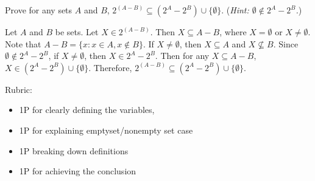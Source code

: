 \documentclass{article}
\theoremstyle{definition}
\begin{document}
\begin{question}{4}
   Prove for any sets $A$ and $B$, $2^{(A-B)} \subseteq ( 2^A - 2^B) \cup \{\emptyset\}$. (\textit{Hint: $\emptyset \notin 2^A - 2^B$.})
\end{question}
\begin{solution}
Let $A$ and $B$ be sets. Let $X\in 2^{(A-B)}$. Then $X\subseteq A-B$, where $X=\emptyset$ or $X\neq \emptyset$. Note that $A-B=\{x : x\in A, x\notin B\}$. If $X\neq \emptyset$, then $X\subseteq A$ and $X\not\subseteq B$. Since $\emptyset \notin 2^A - 2^B$, if $X\neq \emptyset$, then $X\in 2^A-2^B$. Then for any $X\subseteq A-B$, $X\in (2^A-2^B)\cup \{\emptyset\}$. Therefore, $2^{(A-B)} \subseteq ( 2^A - 2^B) \cup \{\emptyset\}$.


{\color{red} Rubric:
\begin{itemize}
\item 1P for clearly defining the variables, 
\item 1P for explaining emptyset/nonempty set case
\item 1P breaking down definitions
\item 1P for achieving the conclusion
\end{itemize}}
\end{solution}
\end{document}

